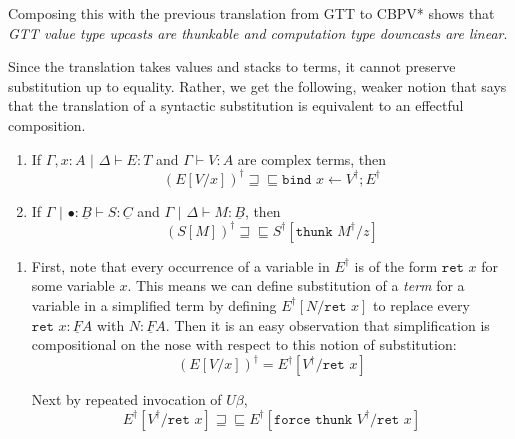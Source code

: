 \documentclass[acmsmall,nonacm]{acmart}
\renewcommand{\u}{\underline}
\newcommand{\cbpvstar}{CBPV*}
\newcommand{\pipe}{\,\,|\,\,}
\newcommand{\ltdyn}{\sqsubseteq}
\newcommand{\gtdyn}{\sqsupseteq}
\newcommand{\equidyn}{\mathrel{\gtdyn\ltdyn}}
\newcommand{\simp}[1]{{#1}^{\dag}}
\newcommand{\simpp}[1]{\simp{({#1})}}
\newcommand{\bindXtoYinZ}[2]{\kw{bind}#2 \leftarrow #1;}
\newcommand{\kw}[1]{\texttt{#1}\,\,}
\newcommand{\ret}{\kw{ret}}
\newcommand{\thunk}{\kw{thunk}}
\newcommand{\force}{\kw{force}}
\begin{document}
{\begin{longonly}
Composing this with the previous translation from GTT to \cbpvstar\/
shows that \emph{GTT value type upcasts are thunkable and computation
  type downcasts are linear}.

Since the translation takes values and stacks to terms, it cannot
preserve substitution up to equality.
%
Rather, we get the following, weaker notion that says that the
translation of a syntactic substitution is equivalent to an effectful
composition.
\begin{lemma}
  \begin{enumerate}
  \item If $\Gamma, x : A\pipe \Delta\vdash E : T$ and $\Gamma \vdash V : A$
    are complex terms, then
    \[ 
    \simpp{E[V/x]} \equidyn \bindXtoYinZ {\simp V} x {\simp E}
    \]
  \item If $\Gamma \pipe \bullet : \u B \vdash S : \u C$ and $\Gamma
    \pipe \Delta \vdash M : \u B$, then
    \[
    \simpp{S[M]} \equidyn \simp{S}[\thunk\simp{M}/z]
    \]
  \end{enumerate}
\end{lemma}
\begin{longproof}
  \begin{enumerate}
  \item   First, note that every occurrence of a variable in $\simp E$ is of
  the form $\ret x$ for some variable $x$. This means we can define
  substitution of a \emph{term} for a variable in a simplified term by
  defining $\simp{E}[N/\ret x]$ to replace every $\ret x : \u F A$
  with $N : \u F A$. Then it is an easy observation that
  simplification is compositional on the nose with respect to this
  notion of substitution:
  \[ \simpp{E[V/x]} = \simp{E}[\simp V / \ret x] \]

  Next by repeated invocation of $U\beta$,
  \[ \simp{E}[\simp V/\ret x] \equidyn \simp{E}[\force\thunk\simp V/\ret x] \]


\end{enumerate}
\end{longproof}
\end{longonly}}
\end{document}
